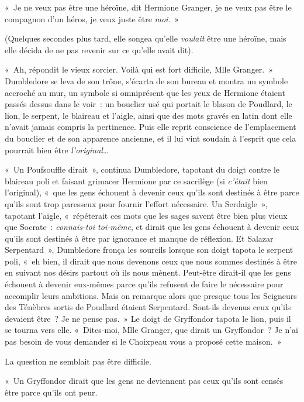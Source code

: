 «~Je ne veux pas être une héroïne, dit Hermione Granger, je ne veux pas être le compagnon d'un héros, je veux juste être \emph{moi}.~»

(Quelques secondes plus tard, elle songea qu'elle \emph{voulait} être une héroïne, mais elle décida de ne pas revenir sur ce qu'elle avait dit).

«~Ah, répondit le vieux sorcier.
Voilà qui est fort difficile, Mlle Granger.~»
Dumbledore se leva de son trône, s'écarta de son bureau et montra un symbole accroché au mur, un symbole si omniprésent que les yeux de Hermione étaient passés dessus dans le voir~: un bouclier usé qui portait le blason de Poudlard, le lion, le serpent, le blaireau et l'aigle, ainsi que des mots gravés en latin dont elle n'avait jamais compris la pertinence.
Puis elle reprit conscience de l'emplacement du bouclier et de son apparence ancienne, et il lui vint soudain à l'esprit que cela pourrait bien être \emph{l'original}…

«~Un Poufsouffle dirait~», continua Dumbledore, tapotant du doigt contre le blaireau poli et faisant grimacer Hermione par ce sacrilège (si \emph{c'était} bien l'original), «~que les gens échouent à devenir ceux qu'ils sont destinés à être parce qu'ils sont trop paresseux pour fournir l'effort nécessaire.
Un Serdaigle~», tapotant l'aigle, «~répéterait ces mots que les sages savent être bien plus vieux que Socrate~: \emph{connais-toi toi-même}, et dirait que les gens échouent à devenir ceux qu'ils sont destinés à être par ignorance et manque de réflexion.
Et Salazar Serpentard~», Dumbledore fronça les sourcils lorsque son doigt tapota le serpent poli, «~eh bien, il dirait que nous devenons ceux que nous sommes destinés à être en suivant nos désirs partout où ils nous mènent.
Peut-être dirait-il que les gens échouent à devenir eux-mêmes parce qu'ils refusent de faire le nécessaire pour accomplir leurs ambitions.
Mais on remarque alors que presque tous les Seigneurs des Ténèbres sortis de Poudlard étaient Serpentard.
Sont-ils devenus ceux qu'ils devaient être~?
Je ne pense pas.~»
Le doigt de Gryffondor tapota le lion, puis il se tourna vers elle.
«~Dites-moi, Mlle Granger, que dirait un Gryffondor~?
Je n'ai pas besoin de vous demander si le Choixpeau vous a proposé cette maison.~»

La question ne semblait pas être difficile.

«~Un Gryffondor dirait que les gens ne deviennent pas ceux qu'ils sont censés être parce qu'ils ont peur.

